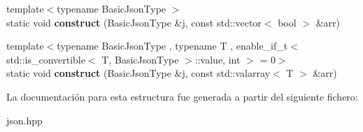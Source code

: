 \begin{DoxyCompactItemize}
\item 
\mbox{\label{structnlohmann_1_1detail_1_1external__constructor_3_01value__t_1_1array_01_4_a4ebb19b1cb84b4cb224a4c5322e16f14}} 
{\footnotesize template$<$typename Basic\+Json\+Type $>$ }\\static void {\bfseries construct} (Basic\+Json\+Type \&j, const std\+::vector$<$ bool $>$ \&arr)
\item 
\mbox{\label{structnlohmann_1_1detail_1_1external__constructor_3_01value__t_1_1array_01_4_a1b9226304e6492141080b4ebf228ddac}} 
{\footnotesize template$<$typename Basic\+Json\+Type , typename T , enable\+\_\+if\+\_\+t$<$ std\+::is\+\_\+convertible$<$ T, Basic\+Json\+Type $>$\+::value, int $>$  = 0$>$ }\\static void {\bfseries construct} (Basic\+Json\+Type \&j, const std\+::valarray$<$ T $>$ \&arr)
\end{DoxyCompactItemize}


La documentación para esta estructura fue generada a partir del siguiente fichero\+:\begin{DoxyCompactItemize}
\item 
json.\+hpp\end{DoxyCompactItemize}
